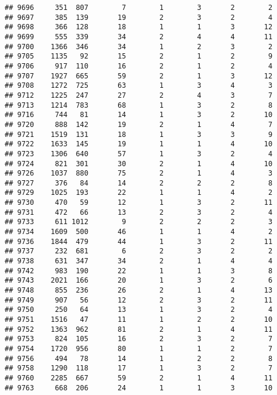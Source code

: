 \documentclass[]{article}
\begin{document}
\begin{verbatim}
## 9696     351  807        7        1        3       2        2
## 9697     385  139       19        2        3       2        4
## 9698     366  128       18        1        1       3       12
## 9699     555  339       34        2        4       4       11
## 9700    1366  346       34        1        2       3        2
## 9705    1135   92       15        2        1       2        9
## 9706     917  110       16        2        1       2        4
## 9707    1927  665       59        2        1       3       12
## 9708    1272  725       63        1        3       4        3
## 9712    1225  247       27        2        4       3        7
## 9713    1214  783       68        1        3       2        8
## 9716     744   81       14        1        3       2       10
## 9720     888  142       19        2        1       4        7
## 9721    1519  131       18        1        3       3        9
## 9722    1633  145       19        1        1       4       10
## 9723    1306  640       57        1        3       2        4
## 9724     821  301       30        2        1       4       10
## 9726    1037  880       75        2        1       4        3
## 9727     376   84       14        2        2       2        8
## 9729    1025  193       22        1        1       4        2
## 9730     470   59       12        1        3       2       11
## 9731     472   66       13        2        3       2        4
## 9733     611 1012        9        2        2       2        3
## 9734    1609  500       46        1        1       4        2
## 9736    1844  479       44        1        3       2       11
## 9737     232  681        6        2        3       2        2
## 9738     631  347       34        2        1       4        4
## 9742     983  190       22        1        1       3        8
## 9743    2021  166       20        1        3       2        6
## 9748     855  236       26        2        1       4       13
## 9749     907   56       12        2        3       2       11
## 9750     250   64       13        1        3       2        4
## 9751    1516   47       11        1        2       2       10
## 9752    1363  962       81        2        1       4       11
## 9753     824  105       16        2        3       2        7
## 9754    1720  956       80        1        1       2        7
## 9756     494   78       14        1        2       2        8
## 9758    1290  118       17        1        3       2        7
## 9760    2285  667       59        2        1       4       11
## 9763     668  206       24        1        1       3       10

\end{verbatim}
\end{document}
